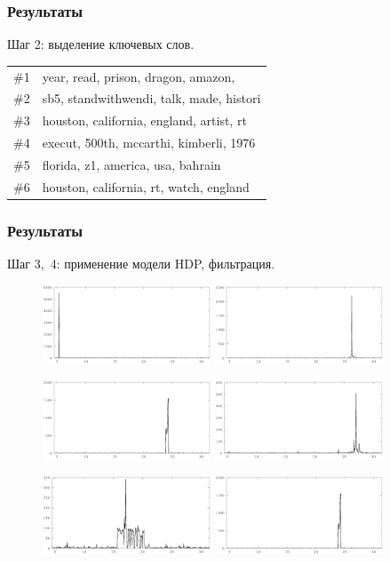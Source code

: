 \documentclass[10pt,pdf,hyperref={unicode}]{beamer}
\begin{document}
\begin{frame}
\frametitle{Результаты}
Шаг 2: выделение ключевых слов.
\begin{table}
\begin{tabular}{r | l}
\#1 & year, read, prison, dragon, amazon, \\
\#2 & sb5, standwithwendi, talk, made, histori \\
\#3 & houston, california, england, artist, rt \\
\#4 & execut, 500th, mccarthi, kimberli, 1976 \\
\#5 & florida, z1, america, usa, bahrain \\
\#6 & houston, california, rt, watch, england \\
\end{tabular}
\end{table}	
\end{frame}

\begin{frame}
\frametitle{Результаты}
Шаг 3,\ 4: применение модели HDP, фильтрация.
\begin{figure}[H]
\centering
\includegraphics[width=5.0cm]{all-freq-5-8.eps}	
\includegraphics[width=5.0cm]{all-freq-26-5.eps}	

\includegraphics[width=5.0cm]{all-freq-24-6.eps}	
\includegraphics[width=5.0cm]{all-freq-27-0-1.eps}	

\includegraphics[width=5.0cm]{all-freq-17-2-1.eps}	
\includegraphics[width=5.0cm]{all-freq-23-20.eps}	
\end{figure}
\end{frame}
\end{document}
